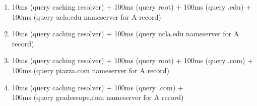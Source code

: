 \documentclass{report}
\begin{document}
\begin{problem}
\begin{answer}{30em}
\begin{enumerate}
  \item 10ms (query caching resolver) + 100ms (query root) +
        100ms (query .edu) + \\ 100ms (query ucla.edu nameserver for A record)
  \item 10ms (query caching resolver) + 100ms (query ucla.edu nameserver for A record)
  \item 10ms (query caching resolver) + 100ms (query root) +
        100ms (query .com) + \\ 100ms (query piazza.com nameserver for A record)
  \item 10ms (query caching resolver) + 100ms (query .com) + \\
        100ms (query gradescope.com nameserver for A record)
  \end{enumerate}
\end{answer}


\end{problem}
\end{document}
